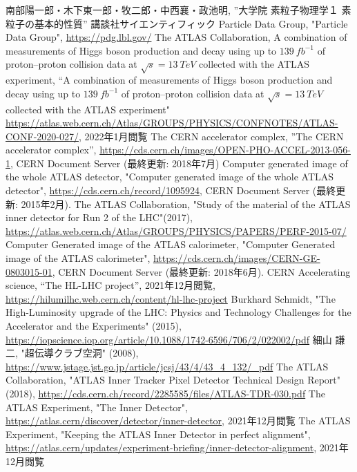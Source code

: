 \begin{thebibliography}{24}
南部陽一郎・木下東一郎・牧二郎・中西襄・政池明,
”大学院 素粒子物理学１ 素粒子の基本的性質”
講談社サイエンティフィック
Particle Data Group, "Particle Data Group", \url{https://pdg.lbl.gov/}
The ATLAS Collaboration, A combination of measurements of Higgs boson production and decay using up to $139\ \si{fb^{-1}}$ of proton–proton collision data at $\sqrt{s} = 13\ \si{TeV}$ collected with the ATLAS experiment, “A combination of measurements of Higgs boson production and decay using up to $139\ \si{fb^{-1}}$ of proton–proton collision data at $\sqrt{s} = 13\ \si{TeV}$ collected with the ATLAS experiment" \url{https://atlas.web.cern.ch/Atlas/GROUPS/PHYSICS/CONFNOTES/ATLAS-CONF-2020-027/}, 2022年1月閲覧
The CERN accelerator complex, ”The CERN accelerator complex”, \url{https://cds.cern.ch/images/OPEN-PHO-ACCEL-2013-056-1}, CERN Document Server (最終更新: 2018年7月)
Computer generated image of the whole ATLAS detector, "Computer generated image of the whole ATLAS detector", \url{https://cds.cern.ch/record/1095924}, CERN Document Server (最終更新: 2015年2月).
The ATLAS Collaboration, "Study of the material of the ATLAS inner detector for Run 2 of the LHC"(2017), \url{https://atlas.web.cern.ch/Atlas/GROUPS/PHYSICS/PAPERS/PERF-2015-07/}
Computer Generated image of the ATLAS calorimeter, "Computer Generated image of the ATLAS calorimeter", \url{https://cds.cern.ch/images/CERN-GE-0803015-01}, CERN Document Server (最終更新: 2018年6月).
CERN Accelerating science, “The HL-LHC project”, 2021年12月閲覧,
\url{https://hilumilhc.web.cern.ch/content/hl-lhc-project}
Burkhard Schmidt, "The High-Luminosity upgrade of the LHC: Physics and Technology Challenges for the Accelerator and the Experiments" (2015),
\url{https://iopscience.iop.org/article/10.1088/1742-6596/706/2/022002/pdf}
細山 謙二, "超伝導クラブ空洞" (2008), \url{https://www.jstage.jst.go.jp/article/jcsj/43/4/43_4_132/_pdf}
The ATLAS Collaboration, "ATLAS Inner Tracker Pixel Detector Technical Design Report" (2018), \url{https://cds.cern.ch/record/2285585/files/ATLAS-TDR-030.pdf}
The ATLAS Experiment, "The Inner Detector", \url{https://atlas.cern/discover/detector/inner-detector}, 2021年12月閲覧
The ATLAS Experiment, "Keeping the ATLAS Inner Detector in perfect alignment", \url{https://atlas.cern/updates/experiment-briefing/inner-detector-alignment}, 2021年12月閲覧

\end{thebibliography}
